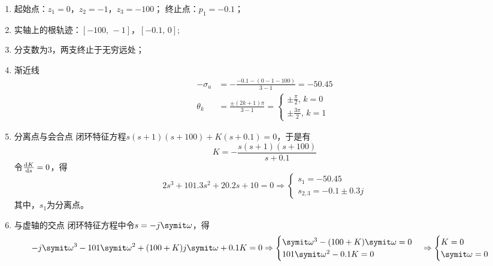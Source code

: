 \begin{exercise}
\begin{enumerate}
\begin{enumerate}
            \item 起始点：$z_1 = 0$，$z_2 = -1$，$z_3 = -100$；
            终止点：$p_1 = -0.1$；
            \item 实轴上的根轨迹：$[-100,\,-1]$，$[-0.1,\,0]$;
            \item 分支数为3，两支终止于无穷远处；
            \item 渐近线
            \begin{align*}
                -\sigma_a &= -\frac{-0.1-(0-1-100)}{3-1} = -50.45 \\
                \theta_k &= \frac{\pm (2k+1)\pi}{3-1} = \begin{cases}
                    \pm \frac{\pi}{2},\,k=0 \\
                    \pm \frac{3\pi}{2},\,k=1
                \end{cases}
            \end{align*}
            \item 分离点与会合点
            闭环特征方程$s(s+1)(s+100)+K(s+0.1) = 0$，于是有
            \begin{equation*}
                K = -\frac{s(s+1)(s+100)}{s+0.1}
            \end{equation*}
            令$\frac{{\rm{d}}{K}}{{\rm{d}}{s}} = 0$，得
            \begin{equation*}
                2s^3 + 101.3s^2 + 20.2s + 10 = 0 \Rightarrow \begin{cases}
                    s_1 = -50.45 \\
                    s_{2,3} = -0.1 \pm 0.3j
                \end{cases}
            \end{equation*}
            其中，$s_1$为分离点。
            \item 与虚轴的交点
            闭环特征方程中令$s=-j\varomega$，得
            \begin{equation*}
                -j\varomega^3 - 101\varomega^2 + (100+K)j\varomega + 0.1K = 0 \Rightarrow \begin{cases}
                    \varomega^3 - (100+K) \varomega = 0 \\
                    101\varomega^2 - 0.1K = 0
                \end{cases} \Rightarrow \begin{cases}
                    K = 0 \\
                    \varomega = 0
                \end{cases}
            \end{equation*}

\end{enumerate}
\end{enumerate}
\end{exercise}
